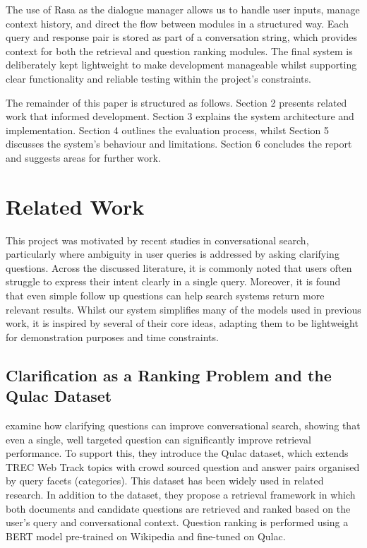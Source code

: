 \documentclass[11pt]{article}
\begin{document}
The use of Rasa as the dialogue manager allows us to handle user inputs, manage context history, and direct the flow between modules in a structured way. Each query and response pair is stored as part of a conversation string, which provides context for both the retrieval and question ranking modules. The final system is deliberately kept lightweight to make development manageable whilst supporting clear functionality and reliable testing within the project's constraints.

The remainder of this paper is structured as follows. Section 2 presents related work that informed development. Section 3 explains the system architecture and implementation. Section 4 outlines the evaluation process, whilst Section 5 discusses the system's behaviour and limitations. Section 6 concludes the report and suggests areas for further work.


\section{Related Work}
This project was motivated by recent studies in conversational search, particularly where ambiguity in user queries is addressed by asking clarifying questions. Across the discussed literature, it is commonly noted that users often struggle to express their intent clearly in a single query. Moreover, it is found that even simple follow up questions can help search systems return more relevant results. Whilst our system simplifies many of the models used in previous work, it is inspired by several of their core ideas, adapting them to be lightweight for demonstration purposes and time constraints.

\subsection{Clarification as a Ranking Problem and the Qulac Dataset}
\citet{Aliannejadi2019} examine how clarifying questions can improve conversational search, showing that even a single, well targeted question can significantly improve retrieval performance. To support this, they introduce the Qulac dataset, which extends TREC Web Track topics with crowd sourced question and answer pairs organised by query facets (categories). This dataset has been widely used in related research. In addition to the dataset, they propose a retrieval framework in which both documents and candidate questions are retrieved and ranked based on the user's query and conversational context. Question ranking is performed using a BERT model pre-trained on Wikipedia and fine-tuned on Qulac.
\end{document}
